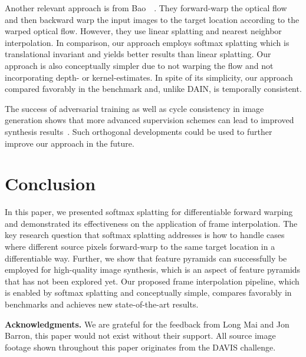 \documentclass[10pt,twocolumn,letterpaper]{article}
\begin{document}
Another relevant approach is from Bao~\etal~\cite{Bao_CVPR_2019}. They forward-warp the optical flow and then backward warp the input images to the target location according to the warped optical flow. However, they use linear splatting and nearest neighbor interpolation. In comparison, our approach employs softmax splatting which is translational invariant and yields better results than linear splatting. Our approach is also conceptually simpler due to not warping the flow and not incorporating depth- or kernel-estimates. In spite of its simplicity, our approach compared favorably in the benchmark and, unlike DAIN, is temporally consistent.

The success of adversarial training as well as cycle consistency in image generation shows that more advanced supervision schemes can lead to improved synthesis results~\cite{Goodfellow_NIPS_2014, Liu_AAAI_2019, Reda_ICCV_2019, Zhu_ICCV_2017}. Such orthogonal developments could be used to further improve our approach in the future. 
\section{Conclusion}
\label{sec:conclusion}

In this paper, we presented softmax splatting for differentiable forward warping and demonstrated its effectiveness on the application of frame interpolation. The key research question that softmax splatting addresses is how to handle cases where different source pixels forward-warp to the same target location in a differentiable way. Further, we show that feature pyramids can successfully be employed for high-quality image synthesis, which is an aspect of feature pyramids that has not been explored yet. Our proposed frame interpolation pipeline, which is enabled by softmax splatting and conceptually simple, compares favorably in benchmarks and achieves new state-of-the-art results.

\vspace{0.05in}
\noindent\textbf{Acknowledgments.} We are grateful for the feedback from Long Mai and Jon Barron, this paper would not exist without their support. All source image footage shown throughout this paper originates from the DAVIS challenge.

{\small


}
\end{document}
